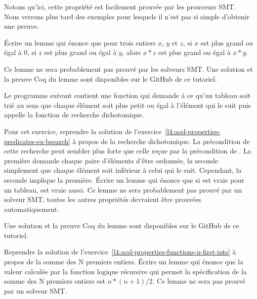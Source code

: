 Notons qu'ici, cette propriété est facilement prouvée par les prouveurs SMT. Nous
verrons plus tard des exemples pour lesquels il n'est pas si simple d'obtenir une
preuve.







Écrire un lemme qui énonce que pour trois entiers $x$, $y$ et $z$, si $x$ est
plus grand ou égal à $0$, si $z$ est plus grand ou égal à $y$, alors $x * z$
est  plus grand ou égal à $x * y$.


Ce lemme ne sera probablement pas prouvé par les solveurs SMT. Une solution et
la preuve Coq du lemme sont disponibles sur le GitHub de ce tutoriel.

\label{l4:acsl-properties-lemmas-lsorted-gsorted}


Le programme suivant contient une fonction qui demande à ce qu'un tableau soit
trié au sens que chaque élément soit plus petit ou égal à l'élément qui le suit
puis appelle la fonction de recherche dichotomique.




Pour cet exercice, reprendre la solution de
l'exercice~\ref{l4:acsl-properties-predicates-ex-bsearch} à propos de la recherche
dichotomique. La précondition de cette recherche peut sembler plus forte que celle
reçue par la précondition de . La première demande
chaque paire d'éléments d'être ordonnée, la seconde simplement que chaque élément
soit inférieur à celui qui le suit. Cependant, la seconde implique la première.
Écrire un lemme qui énonce que si  est vraie
pour un tableau,  est vraie aussi. Ce lemme ne sera probablement
pas prouvé par un solveur SMT, toutes les autres propriétés devraient être prouvées
automatiquement.


Une solution et la preuve Coq du lemme sont disponibles sur le GitHub de ce tutoriel.


\label{l4:acsl-properties-lemmas-n-first-ints}


Reprendre la solution de l'exercice~\ref{l4:acsl-properties-functions-n-first-ints}
à propos de la somme des N premiers entiers. Écrire un lemme qui énonce que la valeur
calculée par la fonction logique récursive qui permet la spécification de la somme des
N premiers entiers est $n*(n+1)/2$. Ce lemme ne sera pas prouvé par un solveur SMT.


